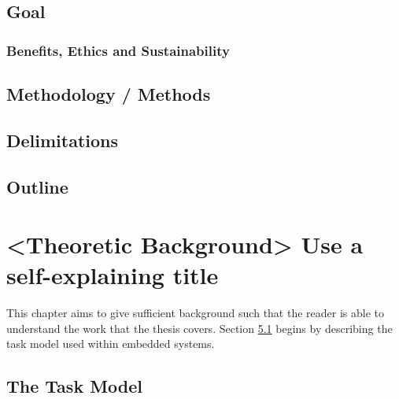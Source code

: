 \documentclass{kththesis}
\begin{document}
\section{Goal}



\subsection{Benefits, Ethics and Sustainability}


\section{Methodology / Methods}


\section{Delimitations}


\section{Outline}



\chapter{<Theoretic Background> Use a self-explaining title}

This chapter aims to give sufficient background such that the reader is able to understand the work
that the thesis covers. Section \ref{sec:the_task_model} begins by describing the task model used
within embedded systems.


\section{The Task Model} \label{sec:the_task_model}
\end{document}
